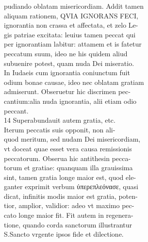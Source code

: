 \documentclass{article}
\begin{document}
\begin{pages}
                pudiando oblatam misericordiam. Addit tamen \\
                aliquam rationem, QVIA IGNORANS FECI, \\
                ignorantia non crassa et affectata, et zelo Le- \\
                gis patriae excitata: leuius tamen peccat qui \\
                per ignorantiam labitur: attamem et is fatetur \\
                peccatum suum, ideo ne his quidem aliud \\
                subuenire potest, quam nuda Dei miseratio. \\
                In Iudaeis cum ignorantia coniunctum fuit \\
                odium bonae causae, ideo nec oblatam gratiam \\
                admiserunt. Obseruetur hic discrimen pec- \\
                cantium:alia nuda ignorantia, alii etiam odio \\
                peccant. \\
                14 Superabundauit autem gratia, etc. \\
                Iterum peccatis suis opponit, non ali- \\
                quod meritum, sed nudam Dei misericordiam, \\
                vt doceat quae esset vera causa remissionis \\
                peccatorum. Obserua hic antithesin pecca- \\
                torum et gratiae: quanquam illa grauissima \\
                sint, tamen gratia longe maior est, quod ele- \\
                ganter exprimit verbum ὐπερεπλεόνασε, quasi \\
                dicat, infinitis modis maior est gratia, poten- \\
                tior, amplior, validior: adeo vt maximo pec- \\
                cato longe maior fit. Fit autem in regenera- \\
                tione, quando corda sanctorum illustrantur \\
                S.Sancto vrgente ipsos fide et dilectione. \\

\end{pages}
\end{document}
